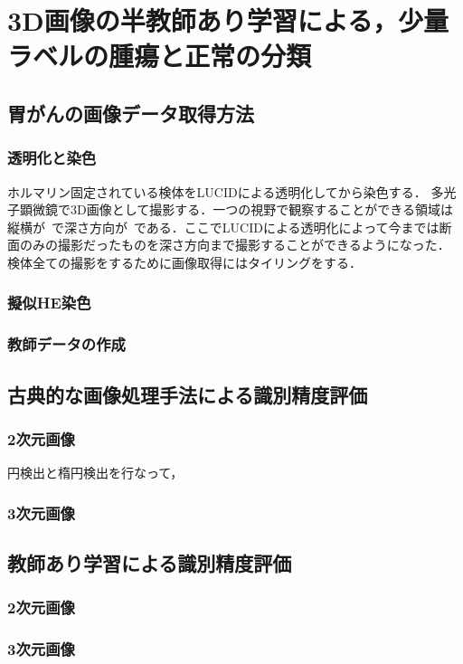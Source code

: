 \chapter{3D画像の半教師あり学習による，少量ラベルの腫瘍と正常の分類}

\section{胃がんの画像データ取得方法}

\subsection{透明化と染色}
ホルマリン固定されている検体をLUCIDによる透明化してから染色する．
多光子顕微鏡で3D画像として撮影する．一つの視野で観察することができる領域は縦横が~で深さ方向が~である．ここでLUCIDによる透明化によって今までは断面のみの撮影だったものを深さ方向まで撮影することができるようになった．
検体全ての撮影をするために画像取得にはタイリングをする．

\subsection{擬似HE染色}

\subsection{教師データの作成}

\section{古典的な画像処理手法による識別精度評価}
\subsection{2次元画像}
円検出と楕円検出を行なって，
\subsection{3次元画像}

\section{教師あり学習による識別精度評価}
\subsection{2次元画像}
\subsection{3次元画像}

